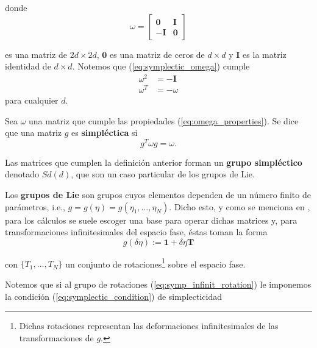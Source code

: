 donde
\begin{equation}
 \omega = 
    \begin{bmatrix}
    \mathbf{0} & \mathbf{I} \\
    -\mathbf{I} & \mathbf{0}
  \end{bmatrix}
 \label{eq:symplectic_omega}
\end{equation}

es una matriz de $2d\times 2d$, $\mathbf{0}$ es una matriz de ceros de $d\times d$ y $\mathbf{I}$ es la matriz identidad de $d\times d$. Notemos que (\ref{eq:symplectic_omega}) cumple
\begin{align}
 \omega^2 &= -\mathbf{I}  \nonumber \\
 \omega^T &= -\omega
 \label{eq:omega_properties}
\end{align}
para cualquier $d$.

\begin{definicion}
Sea $\omega$ una matriz que cumple las propiedades (\ref{eq:omega_properties}). Se dice que una matriz $g$ es \textbf{simpléctica} si
\begin{equation}
 g^T \omega g = \omega.
 \label{eq:symplectic_condition}
\end{equation}
\end{definicion}

Las matrices que cumplen la definición anterior forman un \textbf{grupo simpléctico} denotado $Sd(d)$, que son un caso particular de los grupos de Lie.

Los \textbf{grupos de Lie} son grupos cuyos elementos dependen de un número finito de parámetros, i.e., $g = g(\eta) = g(\eta_1,\ldots,\eta_N)$. Dicho esto, y como se menciona en \cite{ChaosBook}, para los cálculos se suele escoger una base para operar dichas matrices y, para transformaciones infinitesimales del espacio fase, éstas toman la forma
\begin{equation}
 g(\delta \eta) := \mathbf{1} + \delta \eta \mathbf{T}
 \label{eq:symp_infinit_rotation}
\end{equation}

con $\lbrace T_1, \ldots, T_N \rbrace$ un conjunto de rotaciones\footnote{Dichas rotaciones representan las deformaciones infinitesimales de las transformaciones de $g$.} sobre el espacio fase.

Notemos que si al grupo de rotaciones (\ref{eq:symp_infinit_rotation}) le imponemos la condición (\ref{eq:symplectic_condition}) de simplecticidad


